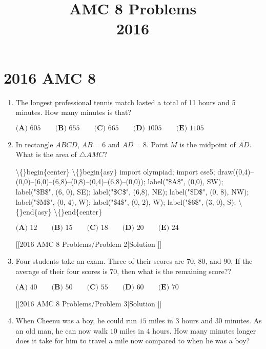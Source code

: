 \documentclass{article}
\title{AMC 8 Problems \\ 2016}
\date{}
\begin{document}
\maketitle\thispagestyle{fancy}\newpage\section*{2016 AMC 8}\begin{enumerate}[label=\arabic*., itemsep=0.5em]\item The longest professional tennis match lasted a total of 11 hours and 5 minutes. How many minutes is that?

\(\textbf{(A) } 605 \qquad\textbf{(B) } 655\qquad\textbf{(C) } 665\qquad\textbf{(D) } 1005\qquad \textbf{(E) } 1105\)\par \vspace{0.5em}\item In rectangle \(ABCD\), \(AB=6\) and \(AD=8\).  Point \(M\) is the midpoint of \(\overline{AD}\).  What is the area of \(\triangle AMC\)?


\textbackslash\{\}begin\{center\}
\textbackslash\{\}begin\{asy\}
import olympiad;
import cse5;
draw((0,4)--(0,0)--(6,0)--(6,8)--(0,8)--(0,4)--(6,8)--(0,0));
label("\$A\$", (0,0), SW);
label("\$B\$", (6, 0), SE);
label("\$C\$", (6,8), NE);
label("\$D\$", (0, 8), NW);
label("\$M\$", (0, 4), W);
label("\$4\$", (0, 2), W);
label("\$6\$", (3, 0), S);
\textbackslash\{\}end\{asy\}
\textbackslash\{\}end\{center\}


\(\textbf{(A) }12\qquad\textbf{(B) }15\qquad\textbf{(C) }18\qquad\textbf{(D) }20\qquad \textbf{(E) }24\)

[[2016 AMC 8 Problems/Problem 2|Solution
]]\par \vspace{0.5em}\item Four students take an exam. Three of their scores are \(70\), \(80\), and \(90\). If the average of their four scores is \(70\), then what is the remaining score??

\(\textbf{(A) }40\qquad\textbf{(B) }50\qquad\textbf{(C) }55\qquad\textbf{(D) }60\qquad \textbf{(E) }70\)

[[2016 AMC 8 Problems/Problem 3|Solution
]]\par \vspace{0.5em}\item When Cheenu was a boy, he could run \(15\) miles in \(3\) hours and \(30\) minutes. As an old man, he can now walk \(10\) miles in \(4\) hours. How many minutes longer does it take for him to travel a mile now compared to when he was a boy?


\end{enumerate}
\end{document}
